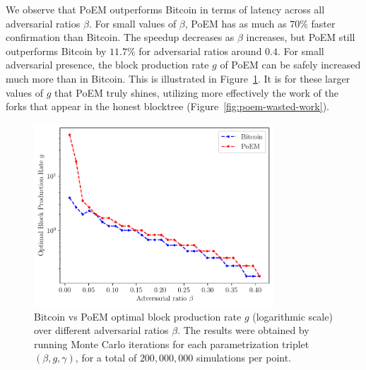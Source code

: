 
We observe that PoEM outperforms Bitcoin in terms of latency across all adversarial ratios $\beta$.
For small values of $\beta$, PoEM has as much as $70\%$ faster confirmation than Bitcoin.
The speedup decreases as $\beta$ increases, but PoEM still outperforms Bitcoin by $11.7\%$ for adversarial ratios around $0.4$.
For small adversarial presence, the block production rate $g$ of PoEM can be safely increased much more than in Bitcoin.
This is illustrated in Figure~\ref{fig:g}.
It is for these larger values of $g$ that PoEM truly shines, utilizing more effectively the work of the
forks that appear in the honest blocktree (Figure~\ref{fig:poem-wasted-work}).

\begin{figure}[h]
    \centering
    \includegraphics[width = 0.8\textwidth]{figures/g.pdf}

    \caption{Bitcoin vs PoEM optimal block production rate $g$ (logarithmic scale) over different adversarial ratios $\beta$.
             The results were obtained by running \montecarlo{} Monte Carlo iterations for each parametrization triplet
             $(\beta, g, \gamma)$, for a total of $200{,}000{,}000$ simulations per point.}
    \label{fig:g}
\end{figure}

